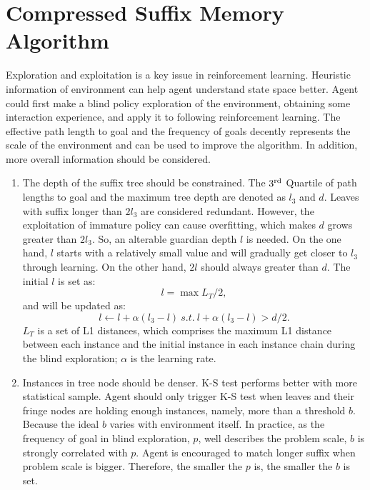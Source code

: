 \documentclass{article}
\begin{document}
\section{Compressed Suffix Memory Algorithm}

Exploration and exploitation is a key issue in reinforcement learning. Heuristic information
of environment can help agent understand state space better. Agent could first make a blind
policy exploration of the environment, obtaining some interaction experience, and apply
it to following reinforcement learning. The effective path length to goal and the frequency
of goals decently represents the scale of the environment and can be used to improve the algorithm.
In addition, more overall information should be considered.

\begin{enumerate}
  \item The depth of the suffix tree should be constrained. The $3^\textnormal{rd}$ Quartile of
  path lengths to goal and the maximum tree depth are denoted as $l_3$ and $d$. Leaves with suffix longer
  than $2l_3$ are considered redundant. However, the exploitation of immature policy can cause overfitting,
  which makes $d$ grows greater than $2l_3$. So, an alterable guardian depth $l$ is needed.
  On the one hand, $l$ starts with a relatively small value and will gradually get closer
  to $l_3$ through learning. On the other hand, $2l$ should always greater than $d$.
  The initial $l$ is set as:
  \begin{equation}
    l = \max{L_T}/2,
  \end{equation}
  and will be updated as:
  \begin{equation}
    l \leftarrow l + \alpha (l_3 - l)  \ s.t. \ l + \alpha (l_3 - l)> d/2. \label{equ:l3}
  \end{equation}
  $L_T$ is a set of L1 distances, which comprises the maximum L1 distance between each
  instance and the initial instance in each instance chain during the blind exploration;
  $\alpha$ is the learning rate.

  \item Instances in tree node should be denser. K-S test performs better with more statistical
  sample. Agent should only trigger K-S test when leaves and their fringe nodes are holding enough
  instances, namely, more than a threshold $b$. Because the ideal $b$ varies with environment itself.
  In practice, as the frequency of goal in blind exploration, $p$, well describes the problem scale,
  $b$ is strongly correlated with $p$. Agent is encouraged to match longer suffix when
  problem scale is bigger. Therefore, the smaller the $p$ is, the smaller the $b$ is set.


\end{enumerate}
\end{document}
